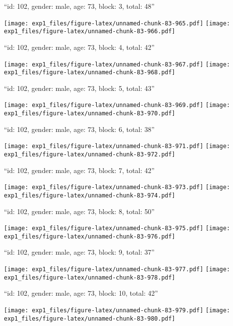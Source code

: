 \documentclass[11pt,,]{article}
\begin{document}
\newpage
[1] 

``id: 102, gender: male, age: 73, block: 3, total: 48''

\texttt{[image: exp1\_files/figure-latex/unnamed-chunk-83-965.pdf]}
\texttt{[image: exp1\_files/figure-latex/unnamed-chunk-83-966.pdf]}

\newpage
[1] 

``id: 102, gender: male, age: 73, block: 4, total: 42''

\texttt{[image: exp1\_files/figure-latex/unnamed-chunk-83-967.pdf]}
\texttt{[image: exp1\_files/figure-latex/unnamed-chunk-83-968.pdf]}

\newpage
[1] 

``id: 102, gender: male, age: 73, block: 5, total: 43''

\texttt{[image: exp1\_files/figure-latex/unnamed-chunk-83-969.pdf]}
\texttt{[image: exp1\_files/figure-latex/unnamed-chunk-83-970.pdf]}

\newpage
[1] 

``id: 102, gender: male, age: 73, block: 6, total: 38''

\texttt{[image: exp1\_files/figure-latex/unnamed-chunk-83-971.pdf]}
\texttt{[image: exp1\_files/figure-latex/unnamed-chunk-83-972.pdf]}

\newpage
[1] 

``id: 102, gender: male, age: 73, block: 7, total: 42''

\texttt{[image: exp1\_files/figure-latex/unnamed-chunk-83-973.pdf]}
\texttt{[image: exp1\_files/figure-latex/unnamed-chunk-83-974.pdf]}

\newpage
[1] 

``id: 102, gender: male, age: 73, block: 8, total: 50''

\texttt{[image: exp1\_files/figure-latex/unnamed-chunk-83-975.pdf]}
\texttt{[image: exp1\_files/figure-latex/unnamed-chunk-83-976.pdf]}

\newpage
[1] 

``id: 102, gender: male, age: 73, block: 9, total: 37''

\texttt{[image: exp1\_files/figure-latex/unnamed-chunk-83-977.pdf]}
\texttt{[image: exp1\_files/figure-latex/unnamed-chunk-83-978.pdf]}

\newpage
[1] 

``id: 102, gender: male, age: 73, block: 10, total: 42''

\texttt{[image: exp1\_files/figure-latex/unnamed-chunk-83-979.pdf]}
\texttt{[image: exp1\_files/figure-latex/unnamed-chunk-83-980.pdf]}
\end{document}
